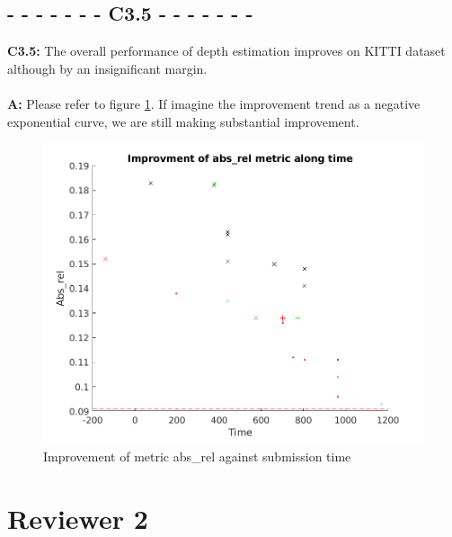 \documentclass[10pt,twocolumn,letterpaper]{article}
\begin{document}
\subsection*{- - - - - - - C3.5 - - - - - - -}
\noindent \textbf{C3.5:} The overall performance of depth estimation improves on KITTI dataset although by an insignificant margin. \\ \\
\noindent \textbf{A:} Please refer to figure \ref{fig:abs_gain}. If imagine the improvement trend as a negative exponential curve, we are still making substantial improvement.
\begin{figure}
    \centering
    \includegraphics[width = \linewidth]{Rebuttal_MutualDepSegBenifits/Fig/abs_rel.png}
    \caption{Improvement of metric abs\_rel against submission time}
    \label{fig:abs_gain}
\end{figure}
\section*{Reviewer 2}
\end{document}
